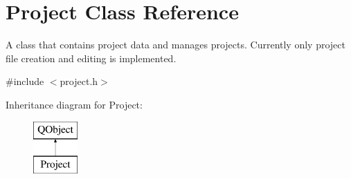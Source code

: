 \hypertarget{class_project}{\section{Project Class Reference}
\label{class_project}
}


A class that contains project data and manages projects. Currently only project file creation and editing is implemented.  




{\ttfamily \#include $<$project.\-h$>$}

Inheritance diagram for Project\-:\begin{figure}[H]
\begin{center}
\leavevmode
\includegraphics[height=2.000000cm]{class_project}
\end{center}
\end{figure}
